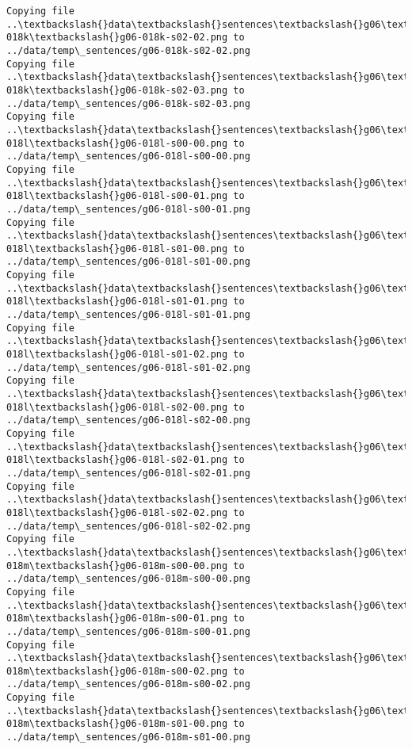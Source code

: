 \documentclass[11pt]{article}
\begin{document}
\begin{Verbatim}[commandchars=\\\{\}]
Copying file ..\textbackslash{}data\textbackslash{}sentences\textbackslash{}g06\textbackslash{}g06-018k\textbackslash{}g06-018k-s02-02.png to
../data/temp\_sentences/g06-018k-s02-02.png
Copying file ..\textbackslash{}data\textbackslash{}sentences\textbackslash{}g06\textbackslash{}g06-018k\textbackslash{}g06-018k-s02-03.png to
../data/temp\_sentences/g06-018k-s02-03.png
Copying file ..\textbackslash{}data\textbackslash{}sentences\textbackslash{}g06\textbackslash{}g06-018l\textbackslash{}g06-018l-s00-00.png to
../data/temp\_sentences/g06-018l-s00-00.png
Copying file ..\textbackslash{}data\textbackslash{}sentences\textbackslash{}g06\textbackslash{}g06-018l\textbackslash{}g06-018l-s00-01.png to
../data/temp\_sentences/g06-018l-s00-01.png
Copying file ..\textbackslash{}data\textbackslash{}sentences\textbackslash{}g06\textbackslash{}g06-018l\textbackslash{}g06-018l-s01-00.png to
../data/temp\_sentences/g06-018l-s01-00.png
Copying file ..\textbackslash{}data\textbackslash{}sentences\textbackslash{}g06\textbackslash{}g06-018l\textbackslash{}g06-018l-s01-01.png to
../data/temp\_sentences/g06-018l-s01-01.png
Copying file ..\textbackslash{}data\textbackslash{}sentences\textbackslash{}g06\textbackslash{}g06-018l\textbackslash{}g06-018l-s01-02.png to
../data/temp\_sentences/g06-018l-s01-02.png
Copying file ..\textbackslash{}data\textbackslash{}sentences\textbackslash{}g06\textbackslash{}g06-018l\textbackslash{}g06-018l-s02-00.png to
../data/temp\_sentences/g06-018l-s02-00.png
Copying file ..\textbackslash{}data\textbackslash{}sentences\textbackslash{}g06\textbackslash{}g06-018l\textbackslash{}g06-018l-s02-01.png to
../data/temp\_sentences/g06-018l-s02-01.png
Copying file ..\textbackslash{}data\textbackslash{}sentences\textbackslash{}g06\textbackslash{}g06-018l\textbackslash{}g06-018l-s02-02.png to
../data/temp\_sentences/g06-018l-s02-02.png
Copying file ..\textbackslash{}data\textbackslash{}sentences\textbackslash{}g06\textbackslash{}g06-018m\textbackslash{}g06-018m-s00-00.png to
../data/temp\_sentences/g06-018m-s00-00.png
Copying file ..\textbackslash{}data\textbackslash{}sentences\textbackslash{}g06\textbackslash{}g06-018m\textbackslash{}g06-018m-s00-01.png to
../data/temp\_sentences/g06-018m-s00-01.png
Copying file ..\textbackslash{}data\textbackslash{}sentences\textbackslash{}g06\textbackslash{}g06-018m\textbackslash{}g06-018m-s00-02.png to
../data/temp\_sentences/g06-018m-s00-02.png
Copying file ..\textbackslash{}data\textbackslash{}sentences\textbackslash{}g06\textbackslash{}g06-018m\textbackslash{}g06-018m-s01-00.png to
../data/temp\_sentences/g06-018m-s01-00.png

\end{Verbatim}
\end{document}
